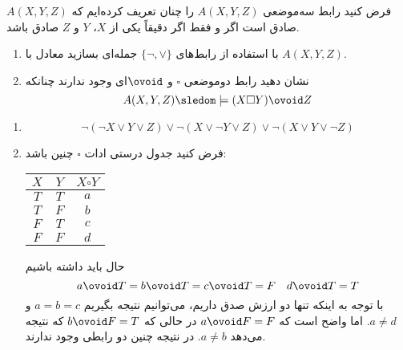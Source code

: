 فرض کنید رابط سه‌موضعی $A(X,Y,Z)$ را چنان تعریف کرده‌ایم که $A(X,Y,Z)$ صادق است اگر و فقط اگر دقیقاً یکی از $X$، $Y$ و $Z$ صادق باشد.
\begin{enumerate}[label=(\alph*)]
\item
با استفاده از رابط‌های
$\{\neg,\vee\}$
جمله‌ای بسازید معادل با
$A(X,Y,Z)$.
\item
نشان دهید رابط دوموضعی $\square$ و $\ovoid$ای وجود ندارند چنانکه
$$
A(X,Y,Z)\sledom\models(X\square Y)\ovoid Z
$$
\end{enumerate}\quad\vspace{-9mm}
\begin{ans}
\begin{enumerate}[label=(\alph*)]
\item
$$
\neg(\neg X\vee Y\vee Z)\vee\neg(X\vee\neg Y\vee Z)\vee\neg(X\vee Y\vee\neg Z)
$$
\item
فرض کنید جدول درستی ادات
$\square$
چنین باشد:
\LTR\begin{center}
    \begin{tabular}{c|c|c}
    $X$ & $Y$ & $X\square Y$ \\
    \hline
    $T$ & $T$ & $a$ \\
    $T$ & $F$ & $b$ \\
    $F$ & $T$ & $c$ \\
    $F$ & $F$ & $d$ \\
    \end{tabular}
\end{center}\RTL
حال باید داشته باشیم
$$
a\ovoid T = b\ovoid T = c\ovoid T = F \quad d\ovoid T = T
$$
با توجه به اینکه تنها دو ارزش صدق داریم، می‌توانیم نتیجه بگیریم
$a=b=c$
و
$a\neq d$.
اما واضح است که
$a\ovoid F=F$
در حالی که
$b\ovoid F=T$
که نتیجه می‌دهد
$a\neq b$.
در نتیجه چنین دو رابطی وجود ندارند.

\end{enumerate}
\end{ans}
